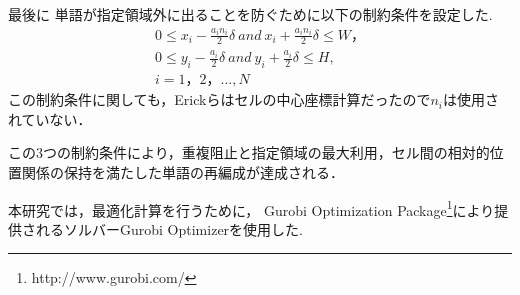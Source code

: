 \documentclass[syuuron]{kuee}
\begin{document}
				最後に 単語が指定領域外に出ることを防ぐために以下の制約条件を設定した.
				\begin{eqnarray}
					0 \le x_i  -  \frac{a_i n_i} {2} \delta \:  and \:  x_i  +  \frac{a_i n_i} {2} \delta \le W，\nonumber \\
					0 \le y_i  -  \frac{a_i} {2} \delta  \: and \:  y_i  +  \frac{a_i} {2} \delta \le H ,\\
					i = 1，2，...,N\nonumber
				\end{eqnarray}
				この制約条件に関しても，Erickらはセルの中心座標計算だったので$n_i$は使用されていない．
				
				この3つの制約条件により，重複阻止と指定領域の最大利用，セル間の相対的位置関係の保持を満たした単語の再編成が達成される．
				
				本研究では，最適化計算を行うために，
				Gurobi Optimization Package\footnote{http://www.gurobi.com/}により提供されるソルバーGurobi Optimizerを使用した.
	
\end{document}

